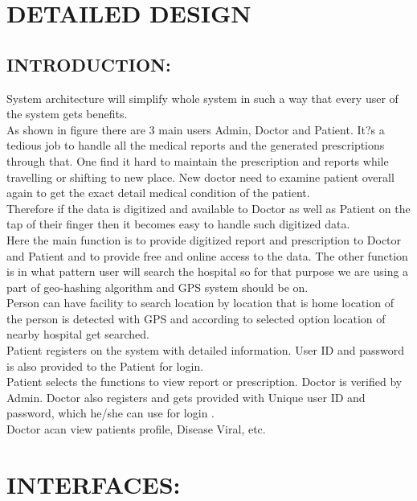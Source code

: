 \documentclass[12pt,]{article}
\begin{document}
\section{DETAILED DESIGN}
\subsection{INTRODUCTION:}
System architecture will simplify whole system in such a way that every user of the system gets benefits.\\ As shown in figure there are 3 main users Admin, Doctor and Patient. It?s a tedious job to handle all the medical reports and the generated prescriptions through that. One find it hard to maintain the prescription and reports while travelling or shifting to new place. New doctor need to examine patient overall again to get the exact detail medical condition of the patient.\cite{chapman1987patient}\\ Therefore if the data is digitized and available to Doctor as well as Patient on the tap of their finger then it becomes easy to handle such digitized data.\\ Here the main function is to provide digitized report and prescription to Doctor and Patient and to provide free and online access to the data. The other function is in what pattern user will search the hospital so for that purpose we are using a part of geo-hashing algorithm and GPS system should be on.\\ Person can have facility to search location by location that is home location of the person is detected with GPS and according to selected option location of nearby hospital get searched.\\
Patient registers on the system with detailed information. User ID and password is also provided to the Patient for login.\\ Patient selects the functions to view report or prescription. Doctor is verified by Admin. Doctor also registers and gets provided with Unique user ID and password, which he/she can use for login .\\ Doctor acan view patients profile, Disease Viral, etc.
\section{INTERFACES:}
\end{document}
